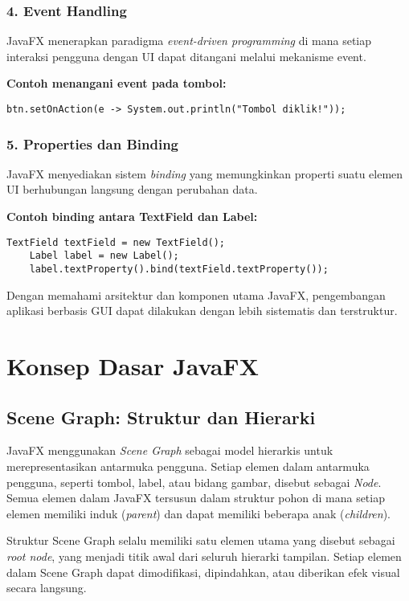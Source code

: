 \subsubsection{4. Event Handling}
JavaFX menerapkan paradigma \textit{event-driven programming} di mana setiap interaksi pengguna dengan UI dapat ditangani melalui mekanisme event.

\textbf{Contoh menangani event pada tombol:}
\begin{lstlisting}[style=JavaStyle, caption=Menangani event klik tombol di JavaFX]
	btn.setOnAction(e -> System.out.println("Tombol diklik!"));
\end{lstlisting}

\subsubsection{5. Properties dan Binding}
JavaFX menyediakan sistem \textit{binding} yang memungkinkan properti suatu elemen UI berhubungan langsung dengan perubahan data.

\textbf{Contoh binding antara TextField dan Label:}
\begin{lstlisting}[style=JavaStyle, caption=Contoh binding dalam JavaFX]
	TextField textField = new TextField();
	Label label = new Label();
	label.textProperty().bind(textField.textProperty());
\end{lstlisting}

Dengan memahami arsitektur dan komponen utama JavaFX, pengembangan aplikasi berbasis GUI dapat dilakukan dengan lebih sistematis dan terstruktur.


\section{Konsep Dasar JavaFX}

\subsection{Scene Graph: Struktur dan Hierarki}

JavaFX menggunakan \textit{Scene Graph} sebagai model hierarkis untuk merepresentasikan antarmuka pengguna. Setiap elemen dalam antarmuka pengguna, seperti tombol, label, atau bidang gambar, disebut sebagai \textit{Node}. Semua elemen dalam JavaFX tersusun dalam struktur pohon di mana setiap elemen memiliki induk (\textit{parent}) dan dapat memiliki beberapa anak (\textit{children}).

Struktur Scene Graph selalu memiliki satu elemen utama yang disebut sebagai \textit{root node}, yang menjadi titik awal dari seluruh hierarki tampilan. Setiap elemen dalam Scene Graph dapat dimodifikasi, dipindahkan, atau diberikan efek visual secara langsung.

